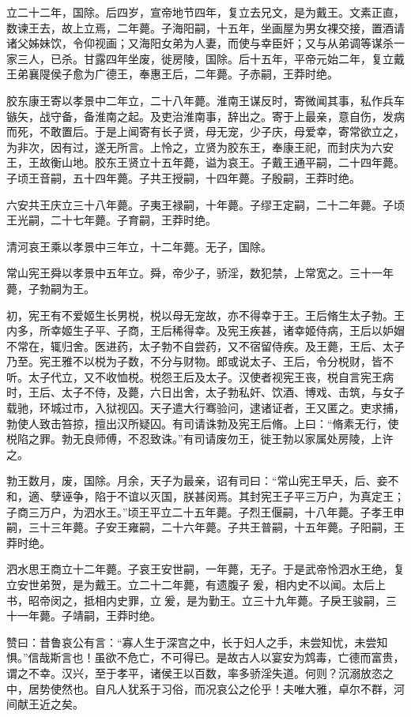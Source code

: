 \documentclass[]{article}
\begin{document}
立二十二年，国除。后四岁，宣帝地节四年，复立去兄文，是为戴王。文素正直，数谏王去，故上立焉，二年薨。子海阳嗣，十五年，坐画屋为男女裸交接，置酒请诸父姊妹饮，令仰视画；又海阳女弟为人妻，而使与幸臣奸；又与从弟调等谋杀一家三人，已杀。甘露四年坐废，徙房陵，国除。后十五年，平帝元始二年，复立戴王弟襄隄侯子愈为广德王，奉惠王后，二年薨。子赤嗣，王莽时绝。

胶东康王寄以孝景中二年立，二十八年薨。淮南王谋反时，寄微闻其事，私作兵车镞矢，战守备，备淮南之起。及吏治淮南事，辞出之。寄于上最亲，意自伤，发病而死，不敢置后。于是上闻寄有长子贤，母无宠，少子庆，母爱幸，寄常欲立之，为非次，因有过，遂无所言。上怜之，立贤为胶东王，奉康王祀，而封庆为六安王，王故衡山地。胶东王贤立十五年薨，谥为哀王。子戴王通平嗣，二十四年薨。子顷王音嗣，五十四年薨。子共王授嗣，十四年薨。子殷嗣，王莽时绝。

六安共王庆立三十八年薨。子夷王禄嗣，十年薨。子缪王定嗣，二十二年薨。子顷王光嗣，二十七年薨。子育嗣，王莽时绝。

清河哀王乘以孝景中三年立，十二年薨。无子，国除。

常山宪王舜以孝景中五年立。舜，帝少子，骄淫，数犯禁，上常宽之。三十一年薨，子勃嗣为王。

初，宪王有不爱姬生长男棁，棁以母无宠故，亦不得幸于王。王后脩生太子勃。王内多，所幸姬生子平、子商，王后稀得幸。及宪王疾甚，诸幸姬侍病，王后以妒媢不常在，辄归舍。医进药，太子勃不自尝药，又不宿留侍疾。及王薨，王后、太子乃至。宪王雅不以棁为子数，不分与财物。郎或说太子、王后，令分棁财，皆不听。太子代立，又不收恤棁。棁怨王后及太子。汉使者视宪王丧，棁自言宪王病时，王后、太子不侍，及薨，六日出舍，太子勃私奸、饮酒、博戏、击筑，与女子载驰，环城过市，入狱视囚。天子遣大行骞验问，逮诸证者，王又匿之。吏求捕，勃使人致击笞掠，擅出汉所疑囚。有司请诛勃及宪王后脩。上曰：``脩素无行，使棁陷之罪。勃无良师傅，不忍致诛。''有司请废勿王，徙王勃以家属处房陵，上许之。

勃王数月，废，国除。月余，天子为最亲，诏有司曰：``常山宪王早夭，后、妾不和，適、孽诬争，陷于不谊以灭国，朕甚闵焉。其封宪王子平三万户，为真定王；子商三万户，为泗水王。''顷王平立二十五年薨。子烈王偃嗣，十八年薨。子孝王申嗣，三十三年薨。子安王雍嗣，二十六年薨。子共王普嗣，十五年薨。子阳嗣，王莽时绝。

泗水思王商立十二年薨。子哀王安世嗣，一年薨，无子。于是武帝怜泗水王绝，复立安世弟贺，是为戴王。立二十二年薨，有遗腹子爰，相内史不以闻。太后上书，昭帝闵之，抵相内史罪，立爰，是为勤王。立三十九年薨。子戾王骏嗣，三十一年薨。子靖嗣，王莽时绝。

赞曰：昔鲁哀公有言：``寡人生于深宫之中，长于妇人之手，未尝知忧，未尝知惧。''信哉斯言也！虽欲不危亡，不可得已。是故古人以宴安为鸩毒，亡德而富贵，谓之不幸。汉兴，至于孝平，诸侯王以百数，率多骄淫失道。何则？沉溺放恣之中，居势使然也。自凡人犹系于习俗，而况哀公之伦乎！夫唯大雅，卓尔不群，河间献王近之矣。
\end{document}
